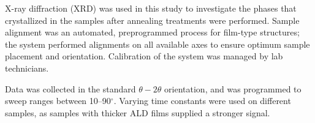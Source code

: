 X-ray diffraction (XRD) was used in this study to investigate the phases that crystallized in the samples after annealing treatments were performed.  Sample alignment was an automated, preprogrammed process for film-type structures; the system performed alignments on all available axes to ensure optimum sample placement and orientation. Calibration of the system was managed by lab technicians. 

Data was collected in the standard $\theta-2\theta$ orientation, and was programmed to sweep ranges between 10--90$^{\circ}$. Varying time constants were used on different samples, as samples with thicker ALD films supplied a stronger signal. 


%





